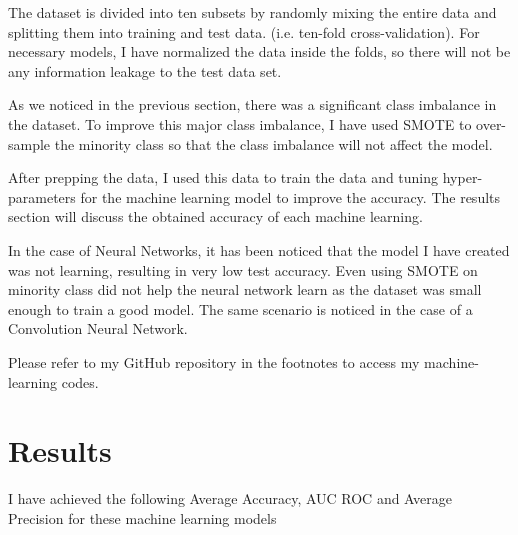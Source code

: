\documentclass[10pt,twocolumn,letterpaper]{article}
\begin{document}
The dataset is divided into ten subsets by randomly mixing the entire data and splitting them into training and test data. (i.e. ten-fold cross-validation). For necessary models, I have normalized the data inside the folds, so there will not be any information leakage to the test data set.

As we noticed in the previous section, there was a significant class imbalance in the dataset. To improve this major class imbalance, I have used SMOTE to over-sample the minority class so that the class imbalance will not affect the model.

After prepping the data, I used this data to train the data and tuning hyper-parameters for the machine learning model to improve the accuracy. The results section will discuss the obtained accuracy of each machine learning.

In the case of Neural Networks, it has been noticed that the model I have created was not learning, resulting in very low test accuracy. Even using SMOTE on minority class did not help the neural network learn as the dataset was small enough to train a good model. The same scenario is noticed in the case of a Convolution Neural Network.

Please refer to my GitHub repository in the footnotes to access my machine-learning codes.\footnotemark[1]

\section{Results}
I have achieved the following Average Accuracy, AUC ROC and Average Precision for these machine learning models 
\end{document}
